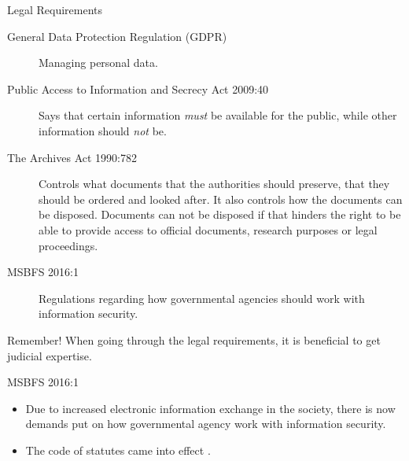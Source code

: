 \documentclass{beamer}
\begin{document}
\begin{frame}{Legal Requirements}
  \footnotesize
  \begin{description}
    \item[General Data Protection Regulation (GDPR)] Managing personal data.

    \item[Public Access to Information and Secrecy Act 2009:40] Says that
      certain information \emph{must} be available for the public, while other
      information should \emph{not} be.

    \item[The Archives Act 1990:782] Controls what documents that the
      authorities should preserve, that they should be ordered and looked after.
			It also controls how the documents can be disposed. Documents can not be
			disposed if that hinders the right to be able to provide access to official
			documents, research purposes or legal proceedings.
    \item[MSBFS 2016:1] Regulations regarding how governmental agencies should
      work with information security.
  \end{description}
  \begin{block}{Remember!}
    When going through the legal requirements, it is beneficial to get judicial
    expertise.
  \end{block}
\end{frame}
\begin{frame}{MSBFS 2016:1}
  \begin{itemize}
    \item Due to increased electronic information exchange in the society, there
      is now demands put on how governmental agency work with information
      security.
    \item The code of statutes came into effect .
  \end{itemize}
\end{frame}
\end{document}
